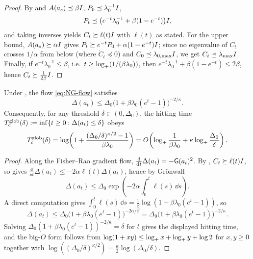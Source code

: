 \begin{proof}
By  and $A(a_s)\preceq\beta I$, $P_0\preceq\lambda_0^{-1}I$,
\[
    P_t
    \preceq
    \bigl(e^{-t}\lambda_0^{-1}+\beta(1-e^{-t})\bigr)I,
\]
and taking inverses yields $C_t\succeq\ell(t)I$ with $\ell(t)$ as stated. For the upper
bound, $A(a_s)\succeq\alpha I$ gives $P_t\succeq e^{-t}P_0+\alpha(1-e^{-t})I$; since no
eigenvalue of $C_t$ crosses $1/\alpha$ from below (where $\dot C_t\preceq0$) and
$C_0\preceq\lambda_{0,\max}I$, we get $C_t\preceq\lambda_{\max}I$. Finally, if
$e^{-t}\lambda_0^{-1}\leq\beta$, i.e.\ $t\geq\log_+(1/(\beta\lambda_0))$, then
$e^{-t}\lambda_0^{-1}+\beta(1-e^{-t})\leq2\beta$, hence $C_t\succeq\tfrac1{2\beta}I$.
\end{proof}

\begin{theorem}
\label{thm:cont-global}
Under , the flow \eqref{eq:NG-flow} satisfies
\[
    \boxed{\;
    \Delta(a_t)
    \leq
    \Delta_0
    \bigl(1+\beta\lambda_0(e^t-1)\bigr)^{-2/\kappa}.
    \;}
\]
Consequently, for any threshold $\delta\in(0,\Delta_0)$, the hitting time
$T_{\mathrm c}^{\mathrm{glob}}(\delta):=\inf\{t\geq0:\Delta(a_t)\leq\delta\}$ obeys
\[
    T_{\mathrm c}^{\mathrm{glob}}(\delta)
    =
    \log\!\left(
        1+\frac{(\Delta_0/\delta)^{\kappa/2}-1}{\beta\lambda_0}
    \right)
    =
    O\!\left(
        \log_+\frac1{\beta\lambda_0}
        +
        \kappa\log_+\frac{\Delta_0}{\delta}
    \right).
\]
\end{theorem}

\begin{proof}
Along the Fisher--Rao gradient flow,
$\tfrac{\mathrm{d}}{\mathrm{d} t}\Delta(a_t)=-\mathsf{G}(a_t)^2$. By ,
$C_t\succeq\ell(t)I$, so  gives
$\tfrac{\dd}{\dd t}\Delta(a_t)\leq-2\alpha\ell(t)\Delta(a_t)$, hence by Gr\"onwall
\[
    \Delta(a_t)\leq\Delta_0\exp\!\left(-2\alpha\int_0^t\ell(s)\,\dd s\right).
\]
A direct computation gives
$\int_0^t\ell(s)\,\dd s=\tfrac1\beta\log(1+\beta\lambda_0(e^t-1))$, so
\[
    \Delta(a_t)
    \leq
    \Delta_0\bigl(1+\beta\lambda_0(e^t-1)\bigr)^{-2\alpha/\beta}
    =
    \Delta_0\bigl(1+\beta\lambda_0(e^t-1)\bigr)^{-2/\kappa}.
\]
Solving $\Delta_0(1+\beta\lambda_0(e^t-1))^{-2/\kappa}=\delta$ for $t$ gives the displayed
hitting time, and the big-$O$ form follows from $\log(1+xy)\le\log_+ x+\log_+ y+\log 2$ for
$x,y\ge0$ together with $\log((\Delta_0/\delta)^{\kappa/2})=\tfrac\kappa2\log(\Delta_0/\delta)$.
\end{proof}

